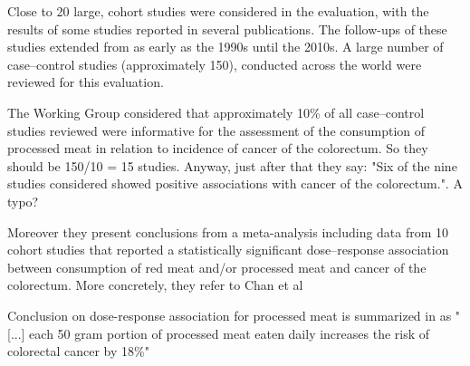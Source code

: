 \documentclass{article}
\begin{document}
Close to 20 large,
cohort studies were considered in the evaluation, with the results
of some studies reported in several publications.
The follow-ups of these studies extended from as
early as the 1990s until the 2010s. A large number
of case–control studies (approximately 150),
conducted across the world were reviewed for
this evaluation.


The Working Group considered that approximately
10\% of all case–control studies reviewed
were informative for the assessment of the
consumption of processed meat in relation to
incidence of cancer of the colorectum. So they should be 150/10 = 15 studies. Anyway, just after that they say: "Six of the nine studies considered showed positive associations with cancer of the colorectum.". A typo?

Moreover they present conclusions from a meta-analysis including data from 10
cohort studies that reported a statistically significant
dose–response association between consumption
of red meat and/or processed meat and cancer of
the colorectum. More concretely, they refer to Chan et al \cite{chan}

Conclusion on dose-response association for processed meat is summarized in \cite{monograph} as "[...] each 50 gram portion of processed meat eaten daily increases the risk of
colorectal cancer by 18\%"
\end{document}
